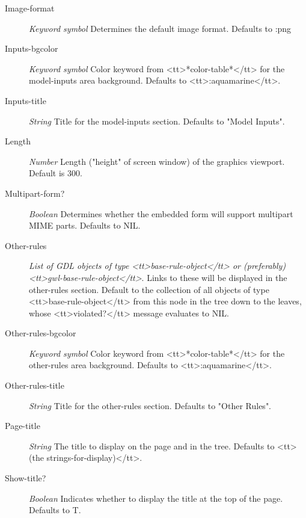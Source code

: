 \documentclass [11pt]{book}
\begin{document}
\begin{itemize}
\begin{description}
\item [Image-format]
\emph{Keyword symbol} Determines the default image format. Defaults to :png


\item [Inputs-bgcolor]
\emph{Keyword symbol} Color keyword from <tt>*color-table*</tt> for the model-inputs area background. Defaults to <tt>:aquamarine</tt>.


\item [Inputs-title]
\emph{String} Title for the model-inputs section. Defaults to "Model Inputs".


\item [Length]
\emph{Number} Length ("height" of screen window) of the graphics viewport. Default is 300.


\item [Multipart-form?]
\emph{Boolean} Determines whether the embedded form will support multipart MIME parts. Defaults to NIL.


\item [Other-rules]
\emph{List of GDL objects of type <tt>base-rule-object</tt> or (preferably) <tt>gwl-base-rule-object</tt>}.
Links to these will be displayed in the other-rules section. Default to the collection of all objects of type
<tt>base-rule-object</tt> from this node in the tree down to the leaves, whose <tt>violated?</tt> message
evaluates to NIL.


\item [Other-rules-bgcolor]
\emph{Keyword symbol} Color keyword from <tt>*color-table*</tt> for the other-rules area  background. Defaults to <tt>:aquamarine</tt>.


\item [Other-rules-title]
\emph{String} Title for the other-rules section. Defaults to "Other Rules".


\item [Page-title]
\emph{String} The title to display on the page and in the tree. Defaults to <tt>(the strings-for-display)</tt>.


\item [Show-title?]
\emph{Boolean} Indicates whether to display the title at the top of the page. Defaults to T.



\end{description}
\end{itemize}
\end{document}
